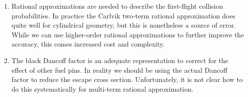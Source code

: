 \begin{enumerate}
  \item Rational approximations are needed to describe the first-flight collision probabilities. In practice the Carlvik two-term rational approximation does quite well for cylindrical geometry, but this is nonetheless a source of error. While we can use higher-order rational approximations to further improve the accuracy, this comes increased cost and complexity. 
  
  \item The black Dancoff factor is an adequate representation to correct for the effect of other fuel pins. In reality we should be using the actual Dancoff factor to reduce the escape cross section. Unfortunately, it is not clear how to do this systematically for multi-term rational approximation.
\end{enumerate}

